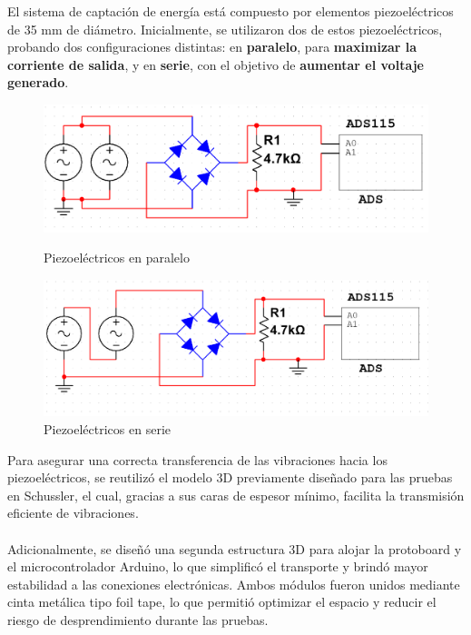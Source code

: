 \documentclass{article}
\begin{document}
El sistema de captación de energía está compuesto por elementos piezoeléctricos de 35 mm de diámetro. Inicialmente, se utilizaron dos de estos piezoeléctricos, probando dos configuraciones distintas: en \textbf{paralelo}, para \textbf{maximizar la corriente de salida}, y en \textbf{serie}, con el objetivo de \textbf{aumentar el voltaje generado}.
\begin{figure}[h]
    \centering
    \begin{minipage}{0.48\textwidth}
        \centering
        \includegraphics[width=\linewidth]{paralelo.png}
        \caption{Piezoeléctricos en paralelo}
        \label{fig:imagen1}
    \end{minipage}
    \hfill
    \begin{minipage}{0.48\textwidth}
        \centering
        \includegraphics[width=\linewidth]{serie.png}
        \caption{Piezoeléctricos en serie}
        \label{fig:imagen2}
    \end{minipage}
\end{figure}

Para asegurar una correcta transferencia de las vibraciones hacia los piezoeléctricos, se reutilizó el modelo 3D previamente diseñado para las pruebas en Schussler, el cual, gracias a sus caras de espesor mínimo, facilita la transmisión eficiente de vibraciones\cite{PrimeraPrueba}.\\
\\
Adicionalmente, se diseñó una segunda estructura 3D para alojar la protoboard y el microcontrolador Arduino, lo que simplificó el transporte y brindó mayor estabilidad a las conexiones electrónicas. Ambos módulos fueron unidos mediante cinta metálica tipo foil tape, lo que permitió optimizar el espacio y reducir el riesgo de desprendimiento durante las pruebas. 
\end{document}
